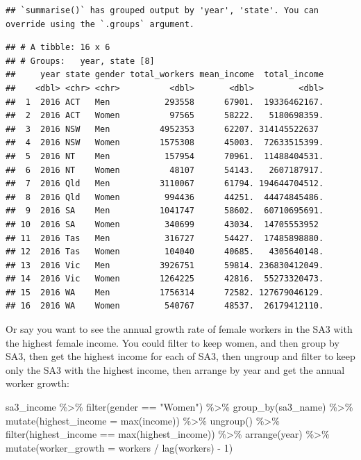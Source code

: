 \documentclass[
]{book}
\newenvironment{Shaded}{\begin{snugshade}}{\end{snugshade}}
\newcommand{\AttributeTok}[1]{\textcolor[rgb]{0.77,0.63,0.00}{#1}}
\newcommand{\DecValTok}[1]{\textcolor[rgb]{0.00,0.00,0.81}{#1}}
\newcommand{\FunctionTok}[1]{\textcolor[rgb]{0.00,0.00,0.00}{#1}}
\newcommand{\NormalTok}[1]{#1}
\newcommand{\SpecialCharTok}[1]{\textcolor[rgb]{0.00,0.00,0.00}{#1}}
\newcommand{\StringTok}[1]{\textcolor[rgb]{0.31,0.60,0.02}{#1}}
\begin{document}
\begin{verbatim}
## `summarise()` has grouped output by 'year', 'state'. You can override using the `.groups` argument.
\end{verbatim}

\begin{verbatim}
## # A tibble: 16 x 6
## # Groups:   year, state [8]
##     year state gender total_workers mean_income  total_income
##    <dbl> <chr> <chr>          <dbl>       <dbl>         <dbl>
##  1  2016 ACT   Men           293558      67901.  19336462167.
##  2  2016 ACT   Women          97565      58222.   5180698359.
##  3  2016 NSW   Men          4952353      62207. 314145522637 
##  4  2016 NSW   Women        1575308      45003.  72633515399.
##  5  2016 NT    Men           157954      70961.  11488404531.
##  6  2016 NT    Women          48107      54143.   2607187917.
##  7  2016 Qld   Men          3110067      61794. 194644704512.
##  8  2016 Qld   Women         994436      44251.  44474845486.
##  9  2016 SA    Men          1041747      58602.  60710695691.
## 10  2016 SA    Women         340699      43034.  14705553952 
## 11  2016 Tas   Men           316727      54427.  17485898880.
## 12  2016 Tas   Women         104040      40685.   4305640148.
## 13  2016 Vic   Men          3926751      59814. 236830412049.
## 14  2016 Vic   Women        1264225      42816.  55273320473.
## 15  2016 WA    Men          1756314      72582. 127679046129.
## 16  2016 WA    Women         540767      48537.  26179412110.
\end{verbatim}

Or say you want to see the annual growth rate of female workers in the SA3 with the highest female income. You could filter to keep women, and then group by SA3, then get the highest income for each of SA3, then ungroup and filter to keep only the SA3 with the highest income, then arrange by year and get the annual worker growth:

\begin{Shaded}
\begin{Highlighting}[]
\NormalTok{sa3\_income }\SpecialCharTok{\%\textgreater{}\%} 
  \FunctionTok{filter}\NormalTok{(gender }\SpecialCharTok{==} \StringTok{"Women"}\NormalTok{) }\SpecialCharTok{\%\textgreater{}\%} 
  \FunctionTok{group\_by}\NormalTok{(sa3\_name) }\SpecialCharTok{\%\textgreater{}\%} 
  \FunctionTok{mutate}\NormalTok{(}\AttributeTok{highest\_income =} \FunctionTok{max}\NormalTok{(income)) }\SpecialCharTok{\%\textgreater{}\%} 
  \FunctionTok{ungroup}\NormalTok{() }\SpecialCharTok{\%\textgreater{}\%} 
  \FunctionTok{filter}\NormalTok{(highest\_income }\SpecialCharTok{==} \FunctionTok{max}\NormalTok{(highest\_income)) }\SpecialCharTok{\%\textgreater{}\%} 
  \FunctionTok{arrange}\NormalTok{(year) }\SpecialCharTok{\%\textgreater{}\%} 
  \FunctionTok{mutate}\NormalTok{(}\AttributeTok{worker\_growth =}\NormalTok{ workers }\SpecialCharTok{/} \FunctionTok{lag}\NormalTok{(workers) }\SpecialCharTok{{-}} \DecValTok{1}\NormalTok{)}
\end{Highlighting}
\end{Shaded}
\end{document}
